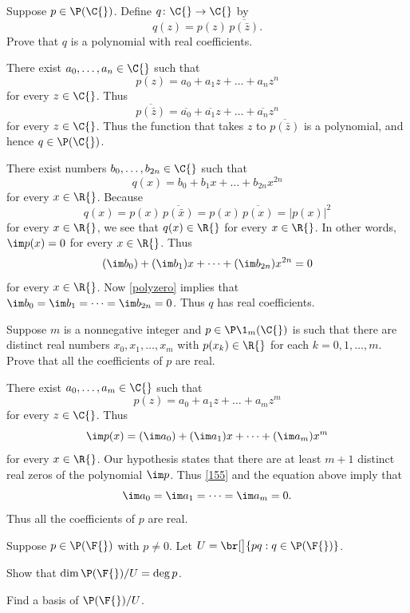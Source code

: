 \exercise
Suppose $p \in \P(\C{})$. Define $q \colon \C{} \to \C{}$ by
\[
q(z) = p(z) \, \overline{ p(\bar{z}) }.
\]
Prove that $q$ is a polynomial with real coefficients.

\begin{Solution}
There exist $a_0, \dots, a_n \in \C{}$ such that
\[
p(z) = a_0 + a_1 z + \dots + a_n z^n
\]
for every $z \in \C{}$. Thus
\[
\overline{ p(\bar{z}) } = \overline{a_0} + \overline{a_1} z + \dots + \overline{a_n} z^n
\]
for every $z \in \C{}$. Thus the function that takes $z$ to $\overline{ p(\bar{z}) }$ is a polynomial, and hence $q \in \P(\C{})$.

There exist numbers $b_0, \dots, b_{2n} \in \C{}$ such that
\[
q(x) = b_0 + b_1 x + \dots + b_{2n} x^{2n}
\]
for every $x \in \R{}$. Because
\[
q(x) = p(x) \, \overline{ p(\bar{x} ) } = p(x) \, \overline{p(x)} = |p(x)|^2
\]
for every $x \in \R{}$, we see that $q(x) \in \R{}$ for every $x \in \R{}$. In other words, $\im p(x) = 0$ for every $x \in \R{}$. Thus
\[
(\im b_0) + (\im b_1)x + \dots + (\im b_{2n}) x^{2n} = 0
\]
for every $x \in \R{}$. Now \ref{polyzero} implies that $\im b_0 = \im b_1 = \dots = \im b_{2n} = 0$. Thus $q$ has real coefficients.
\end{Solution}

\exercise
Suppose $m$ is a nonnegative integer and $p \in \P\1_m(\C{})$ is such that there are distinct real numbers $x_0, x_1, \dots, x_m$ with $p(x_k) \in \R{}$ for each $k = 0, 1, \dots, m$. Prove that all the coefficients of $p$ are real.

\begin{Solution}
There exist $a_0, \dots, a_m \in \C{}$ such that
\[
p(z) = a_0 + a_1 z + \dots + a_m z^m
\]
for every $z \in \C{}$. Thus
\[
\im p(x) = (\im a_0) + (\im a_1)x + \dots + (\im a_m) x^m
\]
for every $x \in \R{}$. Our hypothesis states that there are at least $m+1$ distinct real zeros of the polynomial $\im p$. Thus \ref{155} and the equation above imply that
\[
\im a_0 = \im a_1 = \dots = \im a_m = 0.
\]
Thus all the coefficients of $p$ are real.
\end{Solution}

\pagebreak[2]

\exercise
Suppose $p \in \P(\F{})$ with $p \ne 0$. Let $U = \br[\big]{p q : q \in \P(\F{})}$.
\begin{subtheorem}
\item
Show that $\dim \P(\F{})/U = \deg p$.
\item
Find a basis of $\P(\F{})/U$.
\end{subtheorem}

